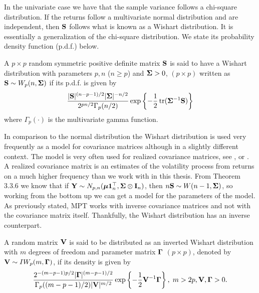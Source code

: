 \documentclass[oneside]{book}\usepackage{knitr}
\begin{document}
In the univariate case we have that the sample variance follows a chi-square distribution. 
If the returns follow a multivariate normal distribution and are independent, then $\mathbf{S}$ follows what is known as a Wishart distribution. 
It is essentially a generalization of the chi-square distribution. 
We state its probability density function (p.d.f.) below.
\begin{definition}\label{def:wishart}
	A $p\times p$ random symmetric positive definite matrix $\mathbf{S}$ is said to have a Wishart distribution with parameters $p, n$ ($n\geq p$) and $\mathbf{\Sigma} > 0$, $(p \times p)$ written as $\mathbf{S} \sim W_p(n, \mathbf{\Sigma})$ if its p.d.f. is given by
	\begin{equation}\label{eqn:wishart_density}
  	\frac{|\mathbf{S}|^{(n-p-1)/2} |\mathbf{\Sigma}|^{- n/2} }{2^{pn/2} \Gamma_p (n/2) } \exp\left\{-\frac{1}{2} \operatorname{tr}(\mathbf{\Sigma}^{-1}\mathbf{S})  \right\}
	\end{equation}
	where $ \Gamma_p (\cdot) $ is the multivariate gamma function.
\end{definition}
In comparison to the normal distribution the Wishart distribution is used very frequently as a model for covariance matrices although in a slightly different context.
The model is very often used for realized covariance matrices, see \citet{barndorff2004econometric}, \citet{golosnoy2019exponential} or \citet{alfelt2021modeling}.
A realized covariance matrix is an estimates of the volatility process from returns on a much higher frequency than we work with in this thesis.
From Theorem 3.3.6 we know that if $\mathbf{Y} \sim N_{p,n}(\mbox{\boldmath$\mu$} \mathbf{1}_n^\top, \mathbf{\Sigma} \otimes \mathbf{I}_n)$, then $n\mathbf{S} \sim W(n-1, \mathbf{\Sigma})$, so working from the bottom up we can get a model for the parameters of the model.
As previously stated, MPT works with inverse covariance matrices and not with the covariance matrix itself. 
Thankfully, the Wishart distribution has an inverse counterpart.
\begin{definition}\label{def:inverse_wishart}
	A random matrix $\mathbf{V}$ is said to be distributed as an inverted Wishart distribution with $m$ degrees of freedom and parameter matrix $\boldsymbol{\Gamma}$ $(p \times p)$, denoted by $\mathbf{V} \sim IW_p(m, \boldsymbol{\Gamma})$, if its density is given by
	\begin{equation}\label{eqn:inverse_wishart}
	\frac{2^{-(m-p-1)p/2} |\boldsymbol{\Gamma}|^{(m-p-1)/2} }{\Gamma_p ((m-p-1)/2) |\mathbf{V}|^{m/2}} \exp\left\{ -\frac{1}{2} \mathbf{V}^{-1} \boldsymbol{\Gamma} \right\}, \; m > 2p, \mathbf{V}, \boldsymbol{\Gamma} > 0.
	\end{equation}
\end{definition}
\end{document}
